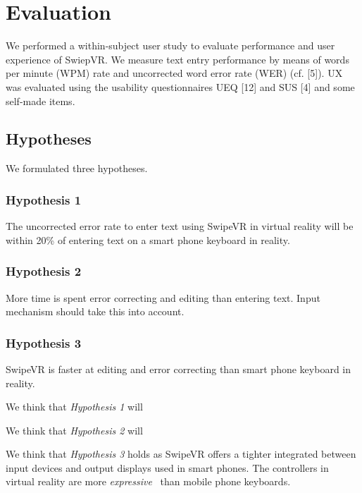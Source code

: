\section{Evaluation}
We performed a within-subject user study to evaluate performance and user experience of SwiepVR.
We measure text entry performance by means of words per minute (WPM) rate and uncorrected word error rate (WER) (cf. [5]). UX was evaluated using the usability
questionnaires UEQ [12] and SUS [4] and some self-made items.


\subsection{Hypotheses}
We formulated three hypotheses.

\subsubsection{Hypothesis 1}
The uncorrected error rate to enter text using SwipeVR in virtual reality will be within 20\% of entering text on a smart phone keyboard in reality.

\subsubsection{Hypothesis 2}
More time is spent error correcting and editing than entering text.  Input mechanism should take this into account.

\subsubsection{Hypothesis 3}
SwipeVR is faster at editing and error correcting than smart phone keyboard in reality.


We think that \textit{Hypothesis 1} will

We think that \textit{Hypothesis 2} will

We think that \textit{Hypothesis 3} holds as SwipeVR offers a tighter integrated between input devices and output displays used in smart phones.
The controllers in virtual reality are more \textit{expressive}~\cite{card1990design} than mobile phone keyboards.

